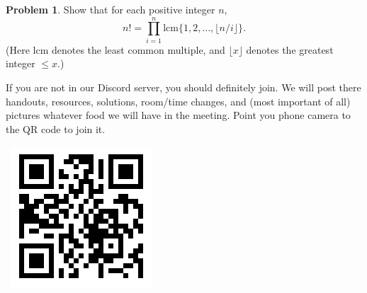 \documentclass{scrartcl}
\theoremstyle{definition}
\newtheorem{prob}{Problem}
\begin{document}
	\begin{prob}%
		Show that for each positive integer $n$,
		\[
			n! = \prod_{i=1}^n  \mathrm{lcm}\{1, 2, \dots, \lfloor n/i\rfloor\} .
		\]
		(Here $\mathrm{lcm}$ denotes the least common multiple, and
		$\lfloor x \rfloor$ denotes the greatest integer $\leq x$.)
	\end{prob}

	\vfill

	\begin{minipage}{.85\textwidth}{}
		\footnotesize
		If you are not in our Discord server, you should definitely join.
		We will post there handouts, resources, solutions, room/time changes, and (most important of all) pictures whatever food we will have in the meeting. Point you phone camera to the QR code to join it.
	\end{minipage}
	\begin{minipage}{.15\textwidth}{}
		\ \hfill \includegraphics[height = .8in]{qr}
	\end{minipage}
\end{document}
